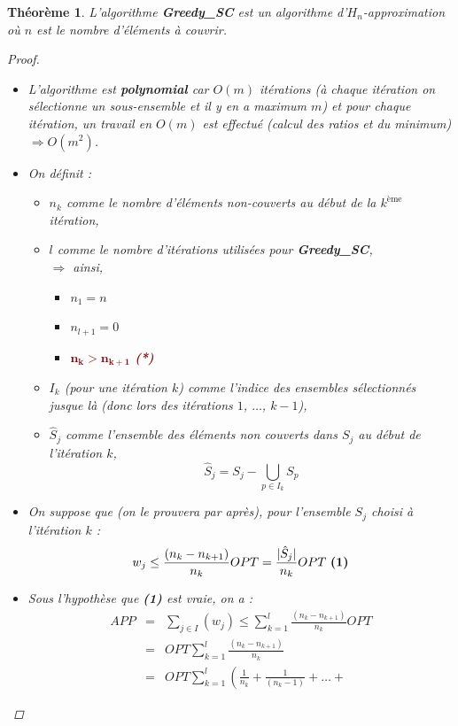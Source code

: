 \documentclass{article}
\newcommand{\rouge}[1]{\textcolor{darkred}{#1}}
\newtheorem{thm}{Th\'eor\`eme}[section]
\newtheorem{proof}{Preuve}[section]
\begin{document}
\begin{sffamily}
\begin{thm}L'algorithme \textbf{Greedy\_SC} est un algorithme
d'$H_n$-approximation où $n$ est le nombre d'éléments à couvrir.
\begin{proof}$ $\\
\begin{itemize}
\item L'algorithme est \textbf{polynomial} car $O(m)$ itérations (à chaque
itération on sélectionne un sous-ensemble et il y en a maximum
$m$) et pour chaque itération, un travail en $O(m)$ est effectué (calcul des
ratios et du minimum) $\Rightarrow O(m^2)$.
\item On définit :
	\begin{itemize}
	\item[$\blacktriangle$] $n_k$ comme le nombre d'éléments non-couverts au
    début de la $k^{\text{ème}}$ itération,
	\item[$\blacktriangle$] $l$ comme le nombre d'itérations utilisées pour
    \textbf{Greedy\_SC},\\
	$\Rightarrow$ ainsi,
		\begin{itemize}
		\item[$\vartriangle$] $n_1 = n$
		\item[$\vartriangle$] $n_{l+1} = 0$
		\item[\rouge{$\blacktriangle$}] \rouge{$\mathbf{n_k > n_{k+1}}$
        \textbf{(*)}}
		\end{itemize}
	\item[$\blacktriangle$] $I_k$ (pour une itération $k$) comme l'indice des
    ensembles sélectionnés jusque là (donc lors des itérations
	$1$, $\ldots$, $k-1$),
	\item[$\blacktriangle$] $\hat{S}_j$ comme l'ensemble des éléments non
    couverts dans $S_j$ au début de l'itération $k$,
	$$\hat{S}_j = S_j - \bigcup_{p\in I_k}{S_p}$$
	\end{itemize}
\item On suppose que (on le prouvera par après), pour l'ensemble $S_j$ choisi à
l'itération $k$ :
$$ w_j \leq \frac{(n_k - n_{k+1})}{n_k}OPT = \frac{|\hat{S}_j|}{n_k}OPT\
\text{\textbf{(1)}}$$
\item Sous l'hypothèse que \textbf{(1)} est vraie, on a :
$$ \begin{eqnarray}
APP & = & \sum_{j\in I}(w_j) \leq \sum_{k=1}^l \frac{(n_k -n_{k+1})}{n_k}OPT\\
	& = & OPT \sum_{k=1}^l \frac{(n_k -n_{k+1})}{n_k}\\
	& = & OPT \sum_{k=1}^l \left(\frac{1}{n_k} + \frac{1}{(n_k-1)} +\ldots +

\end{eqnarray}$$
\end{itemize}
\end{proof}
\end{thm}
\end{sffamily}
\end{document}
